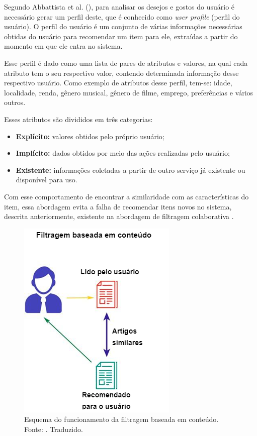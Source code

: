 Segundo Abbattista et al. (\citeyear{Abbattista:2002}), para analisar os desejos e gostos do usuário é necessário gerar um perfil deste, que é conhecido como \textit{user profile} (perfil do usuário). O perfil do usuário é um conjunto de várias informações necessárias obtidas do usuário para recomendar um item para ele, extraídas a partir do momento em que ele entra no sistema.

Esse perfil é dado como uma lista de pares de atributos e valores, na qual cada atributo tem o seu respectivo valor, contendo determinada informação desse respectivo usuário. Como exemplo de atributos desse perfil, tem-se: idade, localidade, renda, gênero musical, gênero de filme, emprego, preferências e vários outros.

Esses atributos são divididos em três categorias:
\begin{itemize}
    \item \textbf{Explícito:} valores obtidos pelo próprio usuário;

    \item \textbf{Implícito:} dados obtidos por meio das ações realizadas pelo usuário;

    \item \textbf{Existente:} informações coletadas a partir de outro serviço já existente ou disponível para uso.
\end{itemize}

Com esse comportamento de encontrar a similaridade com as características do item, essa abordagem evita a falha de recomendar itens novos no sistema, descrita anteriormente, existente na abordagem de filtragem colaborativa \cite{Luk:2019}.

\begin{figure}[H]
    \centering
    \includegraphics[scale=0.6]{figuras/referencial_teorico/content_based.png}
    \caption[Esquema do funcionamento da filtragem baseada em conteúdo]{Esquema do funcionamento da filtragem baseada em conteúdo. Fonte: \cite{Jain:2019}. Traduzido.}
    \label{fig:content_based}
\end{figure}

